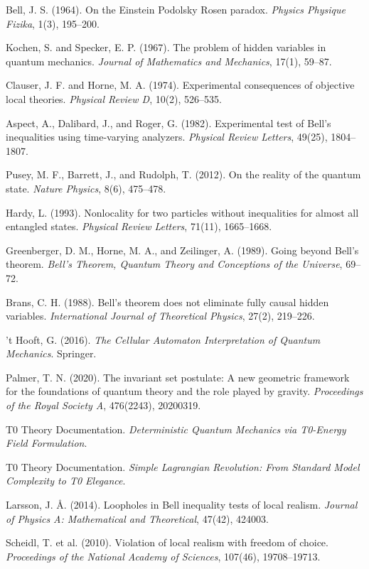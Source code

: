 \documentclass[12pt,a4paper]{article}
\begin{document}
			\begin{thebibliography}{99}
				Bell, J. S. (1964). On the Einstein Podolsky Rosen paradox. \textit{Physics Physique Fizika}, 1(3), 195--200.
				
				Kochen, S. and Specker, E. P. (1967). The problem of hidden variables in quantum mechanics. \textit{Journal of Mathematics and Mechanics}, 17(1), 59--87.
				
				Clauser, J. F. and Horne, M. A. (1974). Experimental consequences of objective local theories. \textit{Physical Review D}, 10(2), 526--535.
				
				Aspect, A., Dalibard, J., and Roger, G. (1982). Experimental test of Bell's inequalities using time-varying analyzers. \textit{Physical Review Letters}, 49(25), 1804--1807.
				
				Pusey, M. F., Barrett, J., and Rudolph, T. (2012). On the reality of the quantum state. \textit{Nature Physics}, 8(6), 475--478.
				
				Hardy, L. (1993). Nonlocality for two particles without inequalities for almost all entangled states. \textit{Physical Review Letters}, 71(11), 1665--1668.
				
				Greenberger, D. M., Horne, M. A., and Zeilinger, A. (1989). Going beyond Bell's theorem. \textit{Bell's Theorem, Quantum Theory and Conceptions of the Universe}, 69--72.
				
				Brans, C. H. (1988). Bell's theorem does not eliminate fully causal hidden variables. \textit{International Journal of Theoretical Physics}, 27(2), 219--226.
				
				't Hooft, G. (2016). \textit{The Cellular Automaton Interpretation of Quantum Mechanics}. Springer.
				
				Palmer, T. N. (2020). The invariant set postulate: A new geometric framework for the foundations of quantum theory and the role played by gravity. \textit{Proceedings of the Royal Society A}, 476(2243), 20200319.
				
				T0 Theory Documentation. \textit{Deterministic Quantum Mechanics via T0-Energy Field Formulation}.
				
				T0 Theory Documentation. \textit{Simple Lagrangian Revolution: From Standard Model Complexity to T0 Elegance}.
				
				Larsson, J. Å. (2014). Loopholes in Bell inequality tests of local realism. \textit{Journal of Physics A: Mathematical and Theoretical}, 47(42), 424003.
				
				Scheidl, T. et al. (2010). Violation of local realism with freedom of choice. \textit{Proceedings of the National Academy of Sciences}, 107(46), 19708--19713.
			\end{thebibliography}
			
			
\end{document}
